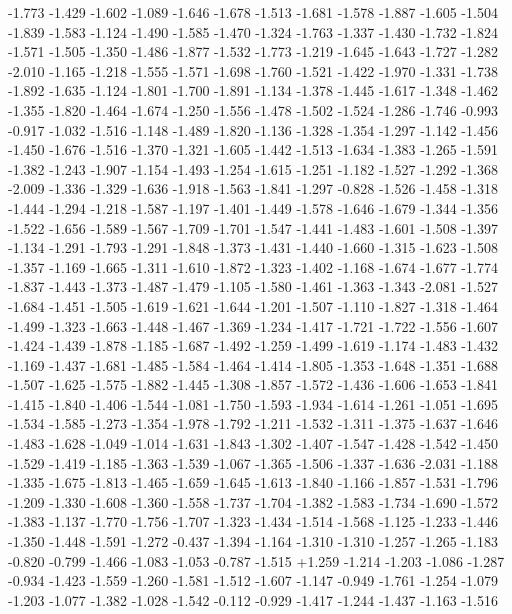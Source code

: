 \documentclass[9pt]{article}
\theoremstyle{plain}
\theoremstyle{definition}
\theoremstyle{remark}
\numberwithin{equation}{section}
\begin{document}
-1.773
-1.429
-1.602
-1.089
-1.646
-1.678
-1.513
-1.681
-1.578
-1.887
-1.605
-1.504
-1.839
-1.583
-1.124
-1.490
-1.585
-1.470
-1.324
-1.763
-1.337
-1.430
-1.732
-1.824
-1.571
-1.505
-1.350
-1.486
-1.877
-1.532
-1.773
-1.219
-1.645
-1.643
-1.727
-1.282
-2.010
-1.165
-1.218
-1.555
-1.571
-1.698
-1.760
-1.521
-1.422
-1.970
-1.331
-1.738
-1.892
-1.635
-1.124
-1.801
-1.700
-1.891
-1.134
-1.378
-1.445
-1.617
-1.348
-1.462
-1.355
-1.820
-1.464
-1.674
-1.250
-1.556
-1.478
-1.502
-1.524
-1.286
-1.746
-0.993
-0.917
-1.032
-1.516
-1.148
-1.489
-1.820
-1.136
-1.328
-1.354
-1.297
-1.142
-1.456
-1.450
-1.676
-1.516
-1.370
-1.321
-1.605
-1.442
-1.513
-1.634
-1.383
-1.265
-1.591
-1.382
-1.243
-1.907
-1.154
-1.493
-1.254
-1.615
-1.251
-1.182
-1.527
-1.292
-1.368
-2.009
-1.336
-1.329
-1.636
-1.918
-1.563
-1.841
-1.297
-0.828
-1.526
-1.458
-1.318
-1.444
-1.294
-1.218
-1.587
-1.197
-1.401
-1.449
-1.578
-1.646
-1.679
-1.344
-1.356
-1.522
-1.656
-1.589
-1.567
-1.709
-1.701
-1.547
-1.441
-1.483
-1.601
-1.508
-1.397
-1.134
-1.291
-1.793
-1.291
-1.848
-1.373
-1.431
-1.440
-1.660
-1.315
-1.623
-1.508
-1.357
-1.169
-1.665
-1.311
-1.610
-1.872
-1.323
-1.402
-1.168
-1.674
-1.677
-1.774
-1.837
-1.443
-1.373
-1.487
-1.479
-1.105
-1.580
-1.461
-1.363
-1.343
-2.081
-1.527
-1.684
-1.451
-1.505
-1.619
-1.621
-1.644
-1.201
-1.507
-1.110
-1.827
-1.318
-1.464
-1.499
-1.323
-1.663
-1.448
-1.467
-1.369
-1.234
-1.417
-1.721
-1.722
-1.556
-1.607
-1.424
-1.439
-1.878
-1.185
-1.687
-1.492
-1.259
-1.499
-1.619
-1.174
-1.483
-1.432
-1.169
-1.437
-1.681
-1.485
-1.584
-1.464
-1.414
-1.805
-1.353
-1.648
-1.351
-1.688
-1.507
-1.625
-1.575
-1.882
-1.445
-1.308
-1.857
-1.572
-1.436
-1.606
-1.653
-1.841
-1.415
-1.840
-1.406
-1.544
-1.081
-1.750
-1.593
-1.934
-1.614
-1.261
-1.051
-1.695
-1.534
-1.585
-1.273
-1.354
-1.978
-1.792
-1.211
-1.532
-1.311
-1.375
-1.637
-1.646
-1.483
-1.628
-1.049
-1.014
-1.631
-1.843
-1.302
-1.407
-1.547
-1.428
-1.542
-1.450
-1.529
-1.419
-1.185
-1.363
-1.539
-1.067
-1.365
-1.506
-1.337
-1.636
-2.031
-1.188
-1.335
-1.675
-1.813
-1.465
-1.659
-1.645
-1.613
-1.840
-1.166
-1.857
-1.531
-1.796
-1.209
-1.330
-1.608
-1.360
-1.558
-1.737
-1.704
-1.382
-1.583
-1.734
-1.690
-1.572
-1.383
-1.137
-1.770
-1.756
-1.707
-1.323
-1.434
-1.514
-1.568
-1.125
-1.233
-1.446
-1.350
-1.448
-1.591
-1.272
-0.437
-1.394
-1.164
-1.310
-1.310
-1.257
-1.265
-1.183
-0.820
-0.799
-1.466
-1.083
-1.053
-0.787
-1.515
+1.259
-1.214
-1.203
-1.086
-1.287
-0.934
-1.423
-1.559
-1.260
-1.581
-1.512
-1.607
-1.147
-0.949
-1.761
-1.254
-1.079
-1.203
-1.077
-1.382
-1.028
-1.542
-0.112
-0.929
-1.417
-1.244
-1.437
-1.163
-1.516
\end{document}
